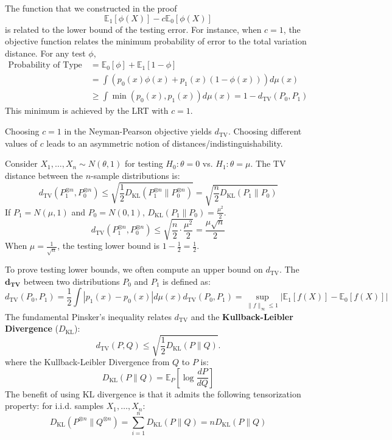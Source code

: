 \begin{remark}
    The function that we constructed in the proof
     $$
     \mathbb{E}_1[\phi(X)] - c \mathbb{E}_0[\phi(X)] 
     $$
     is related to the lower bound of the testing error. For instance, when $c=1$, the objective function relates the minimum probability of error to the total variation distance. For any test $\phi$,
\begin{align*}
    \text{Probability of Type I + Type II error}&=\mathbb{E}_0[\phi] + \mathbb{E}_1[1 - \phi] \\& = \int (p_0(x)\phi(x) + p_1(x)(1 - \phi(x))) d\mu(x) \\
    &\ge \int \min(p_0(x), p_1(x)) d\mu(x)= 1 - d_{\text{TV}}(P_0, P_1)
\end{align*}
This minimum is achieved by the LRT with $c=1$.
\end{remark}

\begin{remark}
    Choosing $c=1$ in the Neyman-Pearson objective yields $d_{\text{TV}}$. Choosing different values of $c$ leads to an asymmetric notion of distances/indistinguishability.
\end{remark}
\begin{eg}
    Consider $X_1, \dots, X_n \sim N(\theta, 1)$ for testing $H_0: \theta=0$ vs. $H_1: \theta=\mu$. The TV distance between the $n$-sample distributions is:
$$
d_{\text{TV}}(P_1^{\otimes n}, P_0^{\otimes n}) \le \sqrt{\frac{1}{2} D_{\text{KL}}(P_1^{\otimes n} \| P_0^{\otimes n})} = \sqrt{\frac{n}{2} D_{\text{KL}}(P_1 \| P_0)}
$$
If $P_1 = N(\mu, 1)$ and $P_0 = N(0, 1)$, $D_{\text{KL}}(P_1 \| P_0) = \frac{\mu^2}{2}$.
$$
d_{\text{TV}}(P_1^{\otimes n}, P_0^{\otimes n}) \le \sqrt{\frac{n}{2} \cdot \frac{\mu^2}{2}} = \frac{\mu\sqrt{n}}{2}
$$
When $\mu = \frac{1}{\sqrt{n}}$, the testing lower bound is $1-\frac{1}{2}=\frac{1}{2}$.
\end{eg}

\begin{remark}
    To prove testing lower bounds, we often compute an upper bound on $d_{\text{TV}}$.
    The $\mathbf{d_{\text{TV}}}$ between two distributions $P_0$ and $P_1$ is defined as:
$$
d_{\text{TV}}(P_0, P_1) = \frac{1}{2} \int |p_1(x) - p_0(x)| d\mu(x)
d_{\text{TV}}(P_0, P_1) = \sup_{\|f\|_{\infty} \le 1} |\mathbb{E}_1[f(X)] - \mathbb{E}_0[f(X)]|
$$
    The fundamental Pinsker's inequality relates $d_{\text{TV}}$ and the \textbf{Kullback-Leibler Divergence} ($D_{\text{KL}}$):
    $$
    d_{\text{TV}}(P, Q) \le \sqrt{\frac{1}{2} D_{\text{KL}}(P \| Q)}.
    $$
    where the Kullback-Leibler Divergence from $Q$ to $P$ is:
$$
D_{\text{KL}}(P \| Q) = \mathbb{E}_P \left[\log \frac{dP}{dQ}\right]
$$
    The benefit of using KL divergence is that it admits the following tensorization property: for i.i.d. samples $X_1, \dots, X_n$:
$$
D_{\text{KL}}(P^{\otimes n} \| Q^{\otimes n}) = \sum_{i=1}^n D_{\text{KL}}(P \| Q) = n D_{\text{KL}}(P \| Q)
$$
\end{remark}

